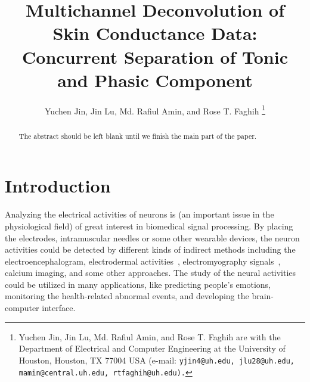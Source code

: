 \documentclass[10pt,conference]{ieeeconf}
\begin{document}
\title{Multichannel Deconvolution of Skin Conductance Data: Concurrent Separation of Tonic and Phasic Component}


\author{Yuchen Jin, Jin Lu, Md. Rafiul Amin, and Rose T. Faghih \thanks{Yuchen Jin, Jin Lu, Md. Rafiul Amin, and Rose T. Faghih are with the Department of Electrical and Computer Engineering at the University of Houston, Houston, TX 77004 USA (e-mail: \tt\small  yjin4@uh.edu, jlu28@uh.edu, mamin@central.uh.edu, rtfaghih@uh.edu).} 
}

\maketitle

\begin{abstract}

The abstract should be left blank until we finish the main part of the paper.

\end{abstract}

\section{Introduction} \label{introduction}

Analyzing the electrical activities of neurons is (an important issue in the physiological field) of great interest in biomedical signal processing. By placing the electrodes, intramuscular needles or some other wearable devices, the neuron activities could be detected by different kinds of indirect methods including the electroencephalogram, electrodermal activities~\cite{savazzi2019estimation,jain2016compressed,amin2019robust}, electromyography signals~\cite{biagetti2016homomorphic}, calcium imaging, and some other approaches. The study of the neural activities could be utilized in many applications, like predicting people's emotions, monitoring the health-related abnormal events, and developing the brain-computer interface.
\end{document}

